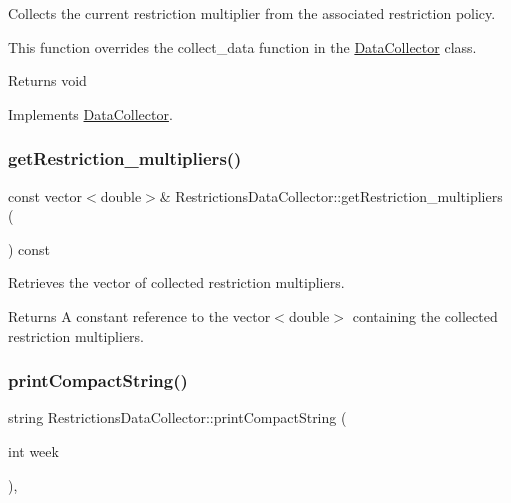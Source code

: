 Collects the current restriction multiplier from the associated restriction policy. 

This function overrides the {\ttfamily collect\+\_\+data} function in the {\ttfamily \mbox{\hyperlink{classDataCollector}{Data\+Collector}}} class.

\begin{DoxyReturn}{Returns}
void 
\end{DoxyReturn}


Implements \mbox{\hyperlink{classDataCollector_a01486bf58acbe37b203f97b3b9a79c40}{Data\+Collector}}.

\mbox{\label{classRestrictionsDataCollector_a576be619485a838e9496fea66181cd06}} 
\subsubsection{\texorpdfstring{get\+Restriction\+\_\+multipliers()}{getRestriction\_multipliers()}}
{\footnotesize\ttfamily const vector$<$double$>$\& Restrictions\+Data\+Collector\+::get\+Restriction\+\_\+multipliers (\begin{DoxyParamCaption}{ }\end{DoxyParamCaption}) const}



Retrieves the vector of collected restriction multipliers. 

\begin{DoxyReturn}{Returns}
A constant reference to the {\ttfamily vector$<$double$>$} containing the collected restriction multipliers. 
\end{DoxyReturn}
\mbox{\label{classRestrictionsDataCollector_ab8b8c30dca6b2e41c1ef5e3ac7e29813}} 
\subsubsection{\texorpdfstring{print\+Compact\+String()}{printCompactString()}}
{\footnotesize\ttfamily string Restrictions\+Data\+Collector\+::print\+Compact\+String (\begin{DoxyParamCaption}\item[{int}]{week }\end{DoxyParamCaption})\hspace{0.3cm}{\ttfamily [override]}, {\ttfamily [virtual]}}



